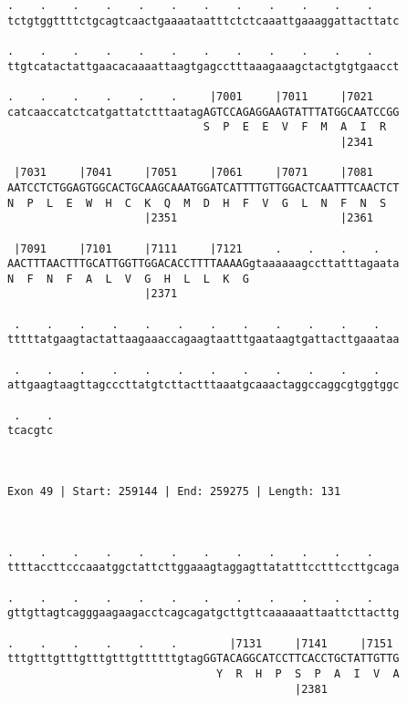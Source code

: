 \documentclass{article}
\begin{document}
\begin{Verbatim}
.    .    .    .    .    .    .    .    .    .    .    .    
tctgtggttttctgcagtcaactgaaaataatttctctcaaattgaaaggattacttatc
                                                            
.    .    .    .    .    .    .    .    .    .    .    .    
ttgtcatactattgaacacaaaattaagtgagcctttaaagaaagctactgtgtgaacct
                                                            
.    .    .    .    .    .     |7001     |7011     |7021    
catcaaccatctcatgattatctttaatagAGTCCAGAGGAAGTATTTATGGCAATCCGG
                              S  P  E  E  V  F  M  A  I  R  
                                                   |2341    
  
 |7031     |7041     |7051     |7061     |7071     |7081    
AATCCTCTGGAGTGGCACTGCAAGCAAATGGATCATTTTGTTGGACTCAATTTCAACTCT
N  P  L  E  W  H  C  K  Q  M  D  H  F  V  G  L  N  F  N  S  
                     |2351                         |2361    
  
 |7091     |7101     |7111     |7121     .    .    .    .   
AACTTTAACTTTGCATTGGTTGGACACCTTTTAAAAGgtaaaaaagccttatttagaata
N  F  N  F  A  L  V  G  H  L  L  K  G                       
                     |2371                                  
  
 .    .    .    .    .    .    .    .    .    .    .    .   
tttttatgaagtactattaagaaaccagaagtaatttgaataagtgattacttgaaataa
                                                            
 .    .    .    .    .    .    .    .    .    .    .    .   
attgaagtaagttagcccttatgtcttactttaaatgcaaactaggccaggcgtggtggc
                                                            
 .    .
tcacgtc
       
       
 
Exon 49 | Start: 259144 | End: 259275 | Length: 131



.    .    .    .    .    .    .    .    .    .    .    .    
ttttaccttcccaaatggctattcttggaaagtaggagttatatttcctttccttgcaga
                                                            
.    .    .    .    .    .    .    .    .    .    .    .    
gttgttagtcagggaagaagacctcagcagatgcttgttcaaaaaattaattcttacttg
                                                            
.    .    .    .    .    .        |7131     |7141     |7151 
tttgtttgtttgtttgtttgttttttgtagGGTACAGGCATCCTTCACCTGCTATTGTTG
                                Y  R  H  P  S  P  A  I  V  A
                                            |2381           
  

\end{Verbatim}
\end{document}
